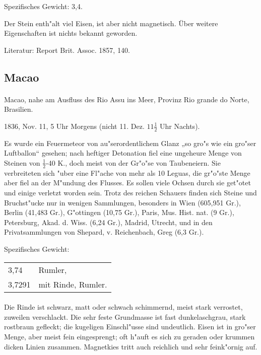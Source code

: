 \documentclass[a4paper, 11pt, oneside]{article}
\begin{document}
Spezifisches Gewicht: 3,4.

Der Stein enth"alt viel Eisen, ist aber nicht magnetisch. Über weitere Eigenschaften ist nichts bekannt geworden.

\footnotesize
Literatur: Report Brit. Assoc. 1857, 140.

\subsection{Macao}
\normalsize
\paragraph{}
Macao, nahe am Ausfluss des Rio Assu ins Meer, Provinz Rio grande do Norte, Brasilien.

1836, Nov. 11, 5 Uhr Morgens (nicht 11. Dez. $11\frac{1}{2}$ Uhr Nachts).

Es wurde ein Feuermeteor von au"serordentlichem Glanz „so gro"s wie ein gro"ser Luftballon“ gesehen; nach heftiger Detonation fiel eine ungeheure Menge von Steinen von $\frac{1}{2}$-40 K., doch meist von der Gr"o"se von Taubeneiern. Sie verbreiteten sich "uber eine Fl"ache von mehr als 10 Leguas, die gr"o"ste Menge aber fiel an der M"undung des Flusses. Es sollen viele Ochsen durch sie get"otet und einige verletzt worden sein. Trotz des reichen Schauers finden sich Steine und Bruchst"ucke nur in wenigen Sammlungen, besonders in Wien (605,951 Gr.), Berlin (41,483 Gr.), G"ottingen (10,75 Gr.), Paris, Mus. Hist. nat. (9 Gr.), Petersburg, Akad. d. Wiss. (6,24 Gr.), Madrid, Utrecht, und in den Privatsammlungen von Shepard, v. Reichenbach, Greg (6,3 Gr.).

Spezifisches Gewicht:  
\begin{table}[!ht]
    \centering
    \begin{tabular}{l l}
        3,74 & Rumler,\\
        3,7291 & mit Rinde, Rumler.
    \end{tabular}
\end{table}
\paragraph{}
Die Rinde ist schwarz, matt oder schwach schimmernd, meist stark verrostet, zuweilen verschlackt. Die sehr feste Grundmasse ist fast dunkelaschgrau, stark rostbraun gefleckt; die kugeligen Einschl"usse sind undeutlich. Eisen ist in gro"ser Menge, aber meist fein eingesprengt; oft h"auft es sich zu geraden oder krummen dicken Linien zusammen. Magnetkies tritt auch reichlich und sehr feink"ornig auf.
\end{document}
